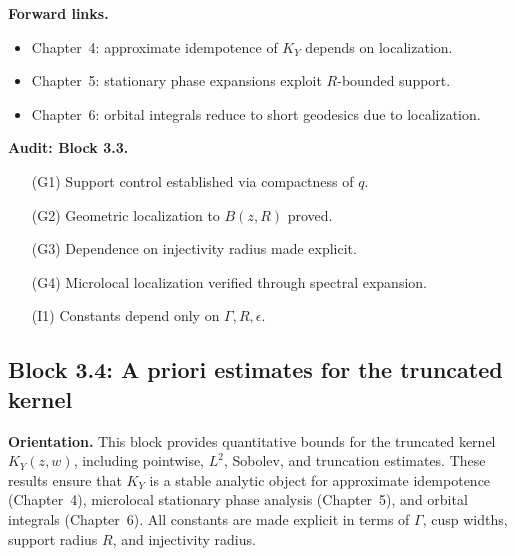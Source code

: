 \medskip

\noindent\textbf{Forward links.}
\begin{itemize}
  \item Chapter~4: approximate idempotence of $K_{Y}$ depends on localization. 
  \item Chapter~5: stationary phase expansions exploit $R$-bounded support. 
  \item Chapter~6: orbital integrals reduce to short geodesics due to localization. 
\end{itemize}

\medskip

\noindent\textbf{Audit: Block 3.3.}
\begin{itemize}
  \item[(G1)] Support control established via compactness of $q$. 
  \item[(G2)] Geometric localization to $B(z,R)$ proved. 
  \item[(G3)] Dependence on injectivity radius made explicit. 
  \item[(G4)] Microlocal localization verified through spectral expansion. 
  \item[(I1)] Constants depend only on $\Gamma,R,\epsilon$. 
\end{itemize}



\subsection{Block 3.4: A priori estimates for the truncated kernel}\label{block:3.4}

\noindent
\textbf{Orientation.}
This block provides quantitative bounds for the truncated kernel $K_{Y}(z,w)$,
including pointwise, $L^{2}$, Sobolev, and truncation estimates.
These results ensure that $K_{Y}$ is a stable analytic object for
approximate idempotence (Chapter~4),
microlocal stationary phase analysis (Chapter~5),
and orbital integrals (Chapter~6).
All constants are made explicit in terms of $\Gamma$, cusp widths, support radius $R$, and injectivity radius.

\medskip

